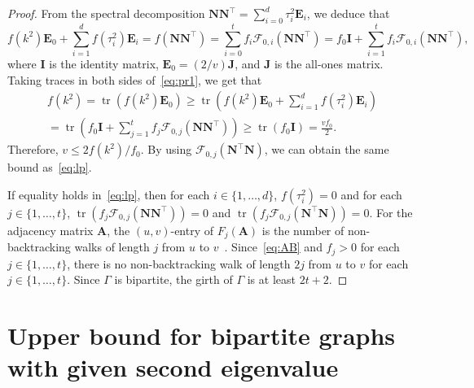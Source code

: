 \documentclass[ALCO,ThmDefs,Unicode,epreuves]{cedram}
\DeclareMathOperator{\tr}{tr}
\begin{document}
\begin{proof}
From the spectral decomposition $\boldsymbol{N}\boldsymbol{N}^{\top}= 
\sum_{i=0}^d \tau_i^2 \boldsymbol{E}_i$, we deduce that 
\begin{equation} \label{eq:pr1}
f(k^2) \boldsymbol{E}_0+ \sum_{i=1}^d f(\tau_i^2) \boldsymbol{E}_i
=f(\boldsymbol{N}\boldsymbol{N}^{\top})=\sum_{i= 0}^t f_i \mathscr{F}_{0,i}(\boldsymbol{N}\boldsymbol{N}^{\top})=
f_0 \boldsymbol{I} + \sum_{i= 1}^t f_i \mathscr{F}_{0,i}(\boldsymbol{N}\boldsymbol{N}^{\top}), 
\end{equation}
where $\boldsymbol{I}$ is the identity matrix, $\boldsymbol{E}_0=(2/v)\boldsymbol{J}$, and $\boldsymbol{J}$ is the all-ones matrix. 
Taking traces in both sides of~\eqref{eq:pr1}, we get that
\begin{multline*}
 f(k^2)=\tr ( f(k^2) \boldsymbol{E}_0 )
\geq \tr \left( f(k^2) \boldsymbol{E}_0+ \sum_{i=1}^d f(\tau_i^2) \boldsymbol{E}_i\right) \\
= 
\tr \left( f_0 \boldsymbol{I} + \sum_{j= 1}^t f_j\mathscr{F}_{0,j}(\boldsymbol{N}\boldsymbol{N}^{\top}) \right) 
\geq \tr ( f_0 \boldsymbol{I})
=\frac{v f_0}{2}. 
\end{multline*}
Therefore, $v\leq 2 f(k^2)/f_0$. 
By using $\mathscr{F}_{0,j}(\boldsymbol{N}^{\top} \boldsymbol{N})$, 
we can obtain the same bound as~\eqref{eq:lp}. 

If equality holds in~\eqref{eq:lp}, then for each $i \in \{1,\ldots, d\}$, $f(\tau_i^2)=0$ and for each $j\in \{1,\dots,t\}$, $\tr (f_j\mathscr{F}_{0,j}(\boldsymbol{N}\boldsymbol{N}^{\top}))=0$ and $\tr (f_j\mathscr{F}_{0,j}(\boldsymbol{N}^{\top} \boldsymbol{N}))=0$. 
 For the adjacency matrix $\boldsymbol{A}$, the $(u,v)$-entry of $F_{j}(\boldsymbol{A})$ is the number of non-backtracking walks of length $j$ from $u$ to $v$~\cite{S66}. 
Since~\eqref{eq:AB} and $f_j>0$ for each $j \in \{1,\ldots, t\}$, there is no non-backtracking walk of length $2j$ from $u$ to $v$ for each $j \in \{1,\ldots, t\}$. Since $\Gamma$ is bipartite, the girth of $\Gamma$ is at least $2t+2$. 
\end{proof}


\section{Upper bound for bipartite graphs with given second eigenvalue}
\label{sec:newbound}
\end{document}
